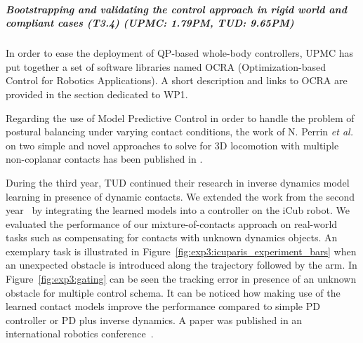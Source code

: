  
\subparagraph*{Bootstrapping and validating the control approach in rigid world and compliant cases (T3.4) (UPMC: 1.79PM, TUD: 9.65PM)}
 
In order to ease the deployment of QP-based whole-body controllers, UPMC has put together a set of software libraries named OCRA (Optimization-based Control for Robotics Applications). A short description and links to OCRA are provided in the section dedicated to WP1.

Regarding the use of Model Predictive Control in order to handle the problem of postural balancing under varying contact conditions, the work of N. Perrin \textit{et al.} on two simple and novel approaches to solve for 3D locomotion with multiple non-coplanar contacts has been published in \cite{perrin_ISRR2015}.

During the third year, TUD continued their research in inverse dynamics model learning in presence of dynamic contacts. 
We extended the work from the second year~\cite{Calandra_ICRA15} by integrating the learned models into a controller on the iCub robot.
We evaluated the performance of our mixture-of-contacts approach on real-world tasks such as compensating for contacts with unknown dynamics objects.
An exemplary task is illustrated in Figure~\ref{fig:exp3:icuparis_experiment_bars} when an unexpected obstacle is introduced along the trajectory followed by the arm.
In Figure~\ref{fig:exp3:gating} can be seen the tracking error in presence of an unknown obstacle for multiple control schema. 
It can be noticed how making use of the learned contact models improve the performance compared to simple PD controller or PD plus inverse dynamics.
A paper was published in an international robotics conference~\cite{calandra2015learning}.


